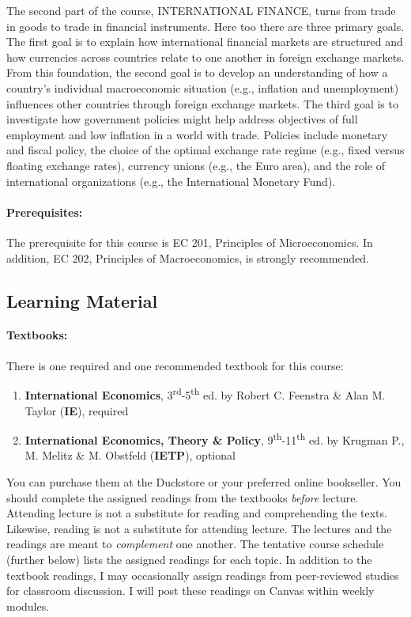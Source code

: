 \documentclass[10pt]{article}
\begin{document}
\noindent The second part of the course, INTERNATIONAL FINANCE, turns from trade in goods to trade in financial instruments.  Here too there are three primary goals.  The first goal is to explain how international financial markets are structured and how currencies across countries relate to one another in foreign exchange markets.  From this foundation, the second goal is to develop an understanding of how a country's individual macroeconomic situation (e.g., inflation and unemployment) influences other countries through foreign exchange markets.  The third goal is to investigate how government policies might help address objectives of full employment and low inflation in a world with trade.  Policies include monetary and fiscal policy, the choice of the optimal exchange rate regime (e.g., fixed versus floating exchange rates), currency unions (e.g., the Euro area), and the role of international organizations (e.g., the International Monetary Fund).   

\paragraph{Prerequisites:} The prerequisite for this course is EC 201, Principles of Microeconomics.  In addition, EC 202, Principles of Macroeconomics, is strongly recommended. 

\newpage

\subsection*{Learning Material}

\paragraph{Textbooks:} There is one required and one recommended textbook for this course:

\begin{enumerate}
	\item {\textbf{International Economics}, 3\textsuperscript{rd}-5\textsuperscript{th} ed.} by Robert C. Feenstra \& Alan M. Taylor (\textbf{IE}), required
	\item {\textbf{International Economics, Theory \& Policy}, 9\textsuperscript{th}-11\textsuperscript{th} ed.} by Krugman P., M. Melitz \& M. Obstfeld (\textbf{IETP}), optional
\end{enumerate}
You can purchase them at the Duckstore or your preferred online bookseller. You should complete the assigned readings from the textbooks \textit{before} lecture. Attending lecture is not a substitute for reading and comprehending the texts. Likewise, reading is not a substitute for attending lecture. The lectures and the readings are meant to \textit{complement} one another. The tentative course schedule (further below) lists the assigned readings for each topic.
In addition to the textbook readings, I may occasionally assign readings from peer-reviewed studies for classroom discussion. I will post these readings on Canvas within weekly modules.
\end{document}
